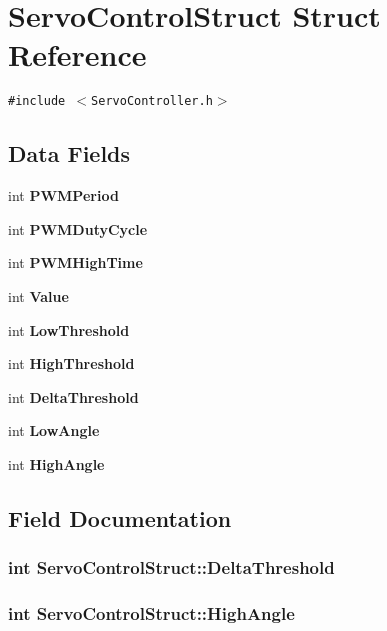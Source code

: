 \section{Servo\-Control\-Struct Struct Reference}
\label{struct_servo_control_struct}
{\tt \#include $<$Servo\-Controller.h$>$}

\subsection*{Data Fields}
\begin{CompactItemize}
\item 
int {\bf PWMPeriod}
\item 
int {\bf PWMDuty\-Cycle}
\item 
int {\bf PWMHigh\-Time}
\item 
int {\bf Value}
\item 
int {\bf Low\-Threshold}
\item 
int {\bf High\-Threshold}
\item 
int {\bf Delta\-Threshold}
\item 
int {\bf Low\-Angle}
\item 
int {\bf High\-Angle}
\end{CompactItemize}


\subsection{Field Documentation}
\subsubsection{\setlength{\rightskip}{0pt plus 5cm}int {\bf Servo\-Control\-Struct::Delta\-Threshold}}\label{struct_servo_control_struct_4f511fe194f5e401a6655ff8ad5b52a6}


\subsubsection{\setlength{\rightskip}{0pt plus 5cm}int {\bf Servo\-Control\-Struct::High\-Angle}}\label{struct_servo_control_struct_24ebbf48f2fa08a965331116ab886277}


